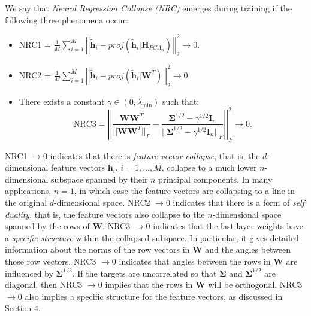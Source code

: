 \documentclass{article}
\theoremstyle{plain}
\theoremstyle{definition}
\theoremstyle{remark}
\newcommand{\bW}{{\mathbf W}}
\newcommand{\bH}{{\mathbf H}}
\newcommand{\bI}{{\mathbf I}}
\newcommand{\bh}{{\mathbf h}}
\newcommand{\bWT}{{\mathbf W}^{T}}
\newcommand{\bhi}{{\mathbf h}_i}
\newcommand{\bSigma}{{\mathbf \Sigma}}
\begin{document}

We say that {\em Neural Regression Collapse (NRC)} emerges during training if the following three phenomena occur: 
\begin{itemize}
    \item NRC1 = $\displaystyle \frac{1}{M} \sum_{i=1}^M \left|\left|\widetilde{\bh}_i - proj(\widetilde{\bh}_i |\bH_{PCA_n}) \right|\right|_2^2\to 0$.
    \item NRC2 = $\displaystyle \frac{1}{M}\sum_{i=1}^M \left|\left|\widetilde{\bh}_i - proj(\widetilde{\bh}_i |\bW^T) \right|\right|_2^2 \to 0$.
    \item There exists a constant $ \gamma \in (0, \lambda_{\min})$ such that:
\[
\text{NRC3} = \left|\left|\frac{\bW\bWT}{||\bW\bWT||_F} - \frac{ \bSigma^{1/2} - \gamma^{1/2} \bI_n }{||\bSigma^{1/2} - \gamma^{1/2} \bI_n||_F }\right|\right|_F^2 \to 0.
\]
\end{itemize}
NRC1 $\to 0$ indicates that there is {\em feature-vector collapse}, that is, the $d$-dimensional feature vectors $\bhi$, $i=1,\ldots,M$, collapse to a much  lower $n$-dimensional subspace spanned by their $n$ principal components. In many applications, $n=1$, in which case the feature vectors are collapsing to a line in the original $d$-dimensional space.
NRC2 $\to 0$ indicates that there is a form of {\em self duality}, that is, the feature vectors also collapse to the $n$-dimensional space spanned by the rows of $\bW$.  
NRC3 $\to 0$ indicates that the last-layer weights have a {\em specific structure} within the collapsed subspace. In particular, it gives detailed information about the norms of the row vectors in $\bW$ and the angles between those row vectors. NRC3 $\to 0$ indicates that angles between the rows in $\bW$ are influenced by $\bSigma^{1/2}$. If the targets are uncorrelated so that $\bSigma$ and $\bSigma^{1/2}$ are diagonal, then NRC3 $\to 0$ implies that the rows in $\bW$ will be orthogonal.  
NRC3 $\to 0$ also implies a specific structure for the feature vectors, as discussed in Section 4. 
\end{document}
